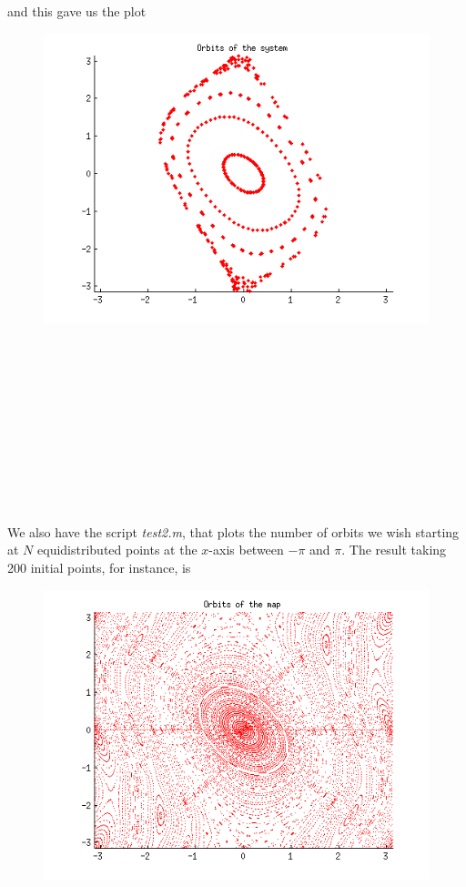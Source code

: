 \documentclass[twoside]{article}
\begin{document}
and this gave us the plot

\begin{figure}[!ht]
\includegraphics[scale=0.5]{test1.png}
\end{figure}

\

\

\

\

\

\

We also have the script {\it test2.m}, that plots the number of orbits we wish starting at $N$ equidistributed points at the $x$-axis between $-\pi$ and $\pi$. The result taking 200 initial points, for instance, is

\begin{figure}[!ht]
\includegraphics[scale=0.5]{test2.png}
\end{figure}
\end{document}
